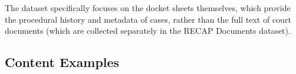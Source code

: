 The dataset specifically focuses on the docket sheets themselves, which provide the procedural history and metadata of cases, rather than the full text of court documents (which are collected separately in the RECAP Documents dataset).

\subsection{Content Examples}
